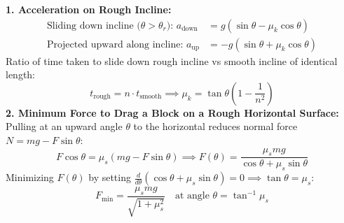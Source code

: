\documentclass[10pt,twoside,openright]{book}
\begin{document}
\begin{formulabox}
\textbf{1. Acceleration on Rough Incline:}
\begin{align}
  \text{Sliding down incline ($\theta > \theta_r$): } a_{\text{down}} &= g(\sin\theta - \mu_k\cos\theta) \\
  \text{Projected upward along incline: } a_{\text{up}} &= -g(\sin\theta + \mu_k\cos\theta)
\end{align}
Ratio of time taken to slide down rough incline vs smooth incline of identical length:
\begin{equation}
  t_{\text{rough}} = n \cdot t_{\text{smooth}} \implies \mu_k = \tan\theta\left(1 - \frac{1}{n^2}\right)
\end{equation}
\textbf{2. Minimum Force to Drag a Block on a Rough Horizontal Surface:}
Pulling at an upward angle $\theta$ to the horizontal reduces normal force $N = mg - F\sin\theta$:
\begin{equation}
  F\cos\theta = \mu_s(mg - F\sin\theta) \implies F(\theta) = \frac{\mu_s mg}{\cos\theta + \mu_s\sin\theta}
\end{equation}
Minimizing $F(\theta)$ by setting $\frac{d}{d\theta}(\cos\theta + \mu_s\sin\theta) = 0 \implies \tan\theta = \mu_s$:
\begin{equation}
  F_{\min} = \frac{\mu_s mg}{\sqrt{1 + \mu_s^2}} \quad \text{at angle } \theta = \tan^{-1}\mu_s
\end{equation}
\end{formulabox}
\end{document}
